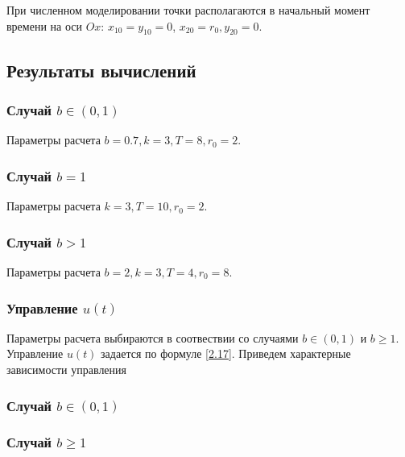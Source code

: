 \documentclass[a4paper,12pt, openany]{book}
\theoremstyle{plain} %
\theoremstyle{definition} %
\theoremstyle{remark} %
\numberwithin{equation}{chapter}
\begin{document}
{При численном моделировании точки располагаются в начальный момент времени на оси $Ox$: $x_{10} = y_{10} = 0$, $x_{20} = r_0, y_{20} = 0$. 


\newpage

\subsection{Результаты вычислений}

\subsubsection*{Случай $b\in(0,1)$}


Параметры расчета $b = 0.7, k = 3, T = 8, r_0 = 2$. 




\newpage

\subsubsection*{Случай $b=1$}


Параметры расчета $k = 3, T = 10, r_0 = 2$. 



\newpage


\subsubsection*{Случай $b>1$}


Параметры расчета $b=2,k = 3, T = 4, r_0 = 8$.




\newpage

\subsubsection{Управление $u(t)$}
Параметры расчета выбираются в соотвествии со случаями $b\in(0,1)$ и $b\geqslant 1$. Управление $u(t)$ задается по формуле \eqref{2.17}. Приведем характерные зависимости управления

\subsubsection*{Случай $b\in(0,1)$}
 


\subsubsection*{Случай $b\geqslant 1$}



}
\end{document}
